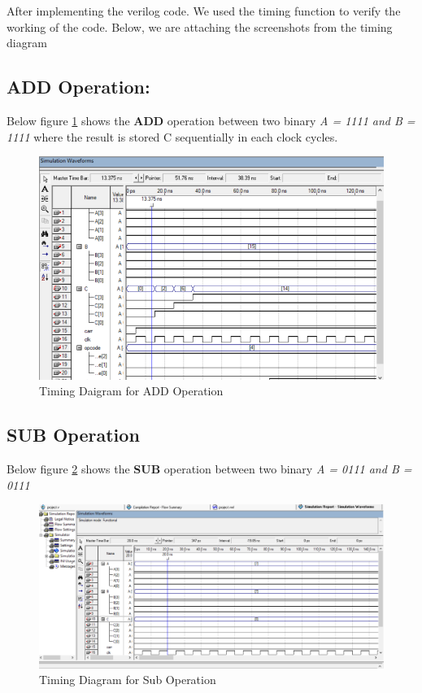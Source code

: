 After implementing the verilog code.
We used the timing function to verify the working of the code.
Below, we are attaching the screenshots from the timing diagram

\subsection{ADD Operation:}\label{subsec:add-operation}
Below figure \ref{fig:timing add} shows the \textbf{ADD} operation between two binary \textit{A = 1111 and B = 1111}
where the result is stored C sequentially in each clock cycles.
\begin{figure}[H]
    \begin{center}
        \includegraphics[scale=0.2]{figures/add}
    \end{center}
    \caption{Timing Daigram for ADD Operation}
    \label{fig:timing add}
\end{figure}

\subsection{SUB Operation}\label{subsec:sub-operation}
Below figure \ref{fig:timing sub} shows the \textbf{SUB} operation between two binary \textit{A = 0111 and B = 0111}
\begin{figure}[H]
    \begin{center}
        \includegraphics[scale=0.1]{figures/sub_operation}
    \end{center}
    \caption{Timing Diagram for Sub Operation}
    \label{fig:timing sub}
\end{figure}

